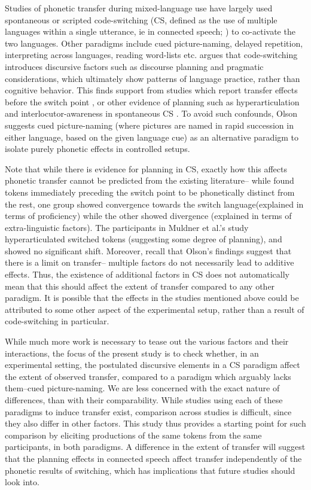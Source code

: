 \documentclass[charis,linguex]{glossa}
\begin{document}
Studies of phonetic transfer during mixed-language use have largely used spontaneous or scripted code-switching (CS, defined as the use of multiple languages within a single utterance, ie in connected speech; \citealp{myers1993dueling}) to co-activate the two languages. Other paradigms include cued picture-naming, delayed repetition, interpreting across languages, reading word-lists etc. \cite{olson2013bilingual} argues that code-switching introduces discursive factors such as discourse planning and pragmatic considerations, which ultimately show patterns of language practice, rather than cognitive behavior. This finds support from studies which report transfer effects before the switch point \citep{bullock2009trying}, or other evidence of planning such as hyperarticulation \citep{muldner2019phonetics} and interlocutor-awareness in spontaneous CS \citep{khattab2013phonetic}. To avoid such confounds, Olson suggests cued picture-naming (where pictures are named in rapid succession in either language, based on the given language cue) as an alternative paradigm to isolate purely phonetic effects in controlled setups. 

Note that while there is evidence for planning in CS, exactly how this affects phonetic transfer cannot be predicted from the existing literature-- while \citep{bullock2009trying} found tokens immediately preceding the switch point to be phonetically distinct from the rest, one group showed convergence towards the switch language(explained in terms of proficiency) while the other showed divergence (explained in terms of extra-linguistic factors). The participants in Muldner et al.'s \citeyear{muldner2019phonetics} study hyperarticulated switched tokens (suggesting some degree of planning), and showed no significant shift. Moreover, recall that Olson's \citeyear{olson2016role} findings suggest that there is a limit on transfer-- multiple factors do not necessarily lead to additive effects. Thus, the existence of additional factors in CS does not automatically mean that this should affect the extent of transfer compared to any other paradigm. It is possible that the effects in the studies mentioned above could be attributed to some other aspect of the experimental setup, rather than a result of code-switching in particular.

While much more work is necessary to tease out the various factors and their interactions, the focus of the present study is to check whether, in an experimental setting, the postulated discursive elements in a CS paradigm affect the extent of observed transfer, compared to a paradigm which arguably lacks them--cued picture-naming. We are less concerned with the exact nature of differences, than with their comparability. While studies using each of these paradigms to induce transfer exist, comparison across studies is difficult, since they also differ in other factors. This study thus provides a starting point for such comparison by eliciting productions of the same tokens from the same participants, in both paradigms. A difference in the extent of transfer will suggest that the planning effects in connected speech affect transfer independently of the phonetic results of switching, which has implications that future studies should look into. 
\end{document}
